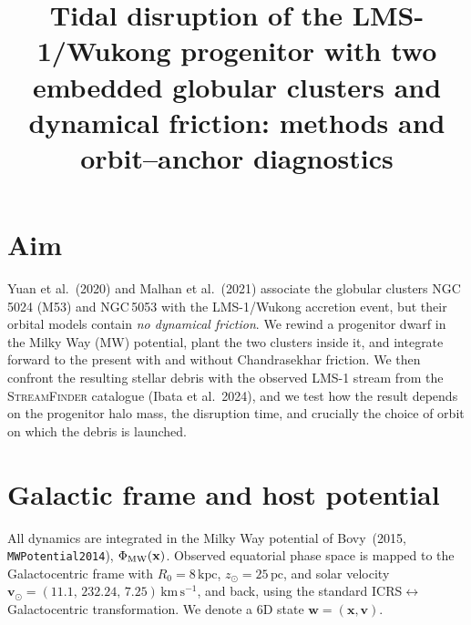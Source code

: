 \documentclass[11pt]{article}
\title{Tidal disruption of the LMS-1/Wukong progenitor with two embedded
globular clusters and dynamical friction: methods and orbit--anchor diagnostics}
\author{}
\date{}
\newcommand{\kpc}{\,\mathrm{kpc}}
\newcommand{\kms}{\,\mathrm{km\,s^{-1}}}
\begin{document}
\maketitle

\section{Aim}
Yuan et al.~(2020) and Malhan et al.~(2021) associate the globular clusters
NGC\,5024 (M53) and NGC\,5053 with the LMS-1/Wukong accretion event, but their
orbital models contain \emph{no dynamical friction}. We rewind a progenitor
dwarf in the Milky Way (MW) potential, plant the two clusters inside it, and
integrate forward to the present with and without Chandrasekhar friction. We
then confront the resulting stellar debris with the observed LMS-1 stream from
the \textsc{StreamFinder} catalogue (Ibata et al.~2024), and we test how the
result depends on the progenitor halo mass, the disruption time, and crucially
the choice of orbit on which the debris is launched.

\section{Galactic frame and host potential}
All dynamics are integrated in the Milky Way potential of Bovy~(2015,
\texttt{MWPotential2014}), $\Phi_{\rm MW}(\mathbf{x})$. Observed equatorial
phase space is mapped to the Galactocentric frame with
$R_0=8\kpc$, $z_\odot=25\,\mathrm{pc}$, and solar velocity
$\mathbf{v}_\odot=(11.1,\,232.24,\,7.25)\kms$, and back, using the standard
ICRS$\leftrightarrow$Galactocentric transformation. We denote a 6D state
$\mathbf{w}=(\mathbf{x},\mathbf{v})$.
\end{document}
